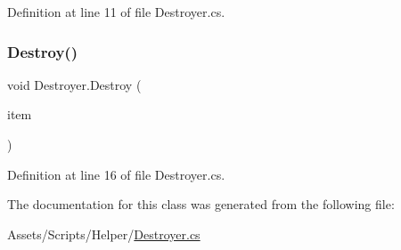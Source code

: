Definition at line 11 of file Destroyer.\+cs.

\mbox{\label{class_destroyer_acd30f0513fecf0c4f08ffeb6c755f04b}} 
\subsubsection{\texorpdfstring{Destroy()}{Destroy()}\hspace{0.1cm}{\footnotesize\ttfamily [2/2]}}
{\footnotesize\ttfamily void Destroyer.\+Destroy (\begin{DoxyParamCaption}\item[{Fixed\+Joint}]{item }\end{DoxyParamCaption})}



Definition at line 16 of file Destroyer.\+cs.



The documentation for this class was generated from the following file\+:\begin{DoxyCompactItemize}
\item 
Assets/\+Scripts/\+Helper/\mbox{\hyperlink{_destroyer_8cs}{Destroyer.\+cs}}\end{DoxyCompactItemize}
